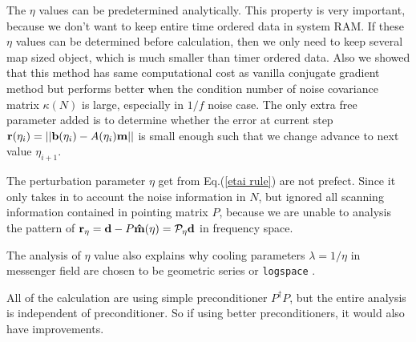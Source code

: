 \documentclass[11pt, letterpaper]{article}
\newcommand{\vbd}{\vb{d}}
\newcommand{\vbm}{\vb{m}}
\newcommand{\vbb}{\vb{b}}
\newcommand{\hatm}{\vb{\hat{m}}}
\newcommand{\Pdagger}{P^{\dagger}}
\begin{document}
The $\eta$ values can be predetermined analytically.
This property is very important, because we don't want to keep entire time
ordered data in system RAM.
If these $\eta$ values can be determined before calculation, then we only need
to keep several map sized object, which is much smaller than timer ordered 
data.
Also we showed that this method has same computational cost as vanilla
conjugate gradient method but performs better when the condition number of 
noise covariance matrix $\kappa(N)$ is large, especially in $1/f$ noise case.
The only extra free parameter added is to determine whether the error at
current step $\vb{r}(\eta_i) = \qty||\vbb(\eta_i) - A(\eta_i) \vbm||$ is small
enough such that we change advance to next value $\eta_{i+1}$.

The perturbation parameter $\eta$ get from Eq.(\ref{etai rule}) are not
prefect. Since it only takes in to account the noise information in $N$,
but ignored all scanning information contained in pointing matrix $P$, because
we are unable to analysis the pattern of
$\vb{r}_{\eta} = \vbd - P\hatm(\eta) = \mathcal{P}_{\eta} \vbd$ in frequency
space.

The analysis of $\eta$ value also explains why cooling parameters
$\lambda=1/\eta$ in messenger field are chosen to be geometric series or
\texttt{logspace} \cite{Huffenberger_2018}.

All of the calculation are using simple preconditioner $\Pdagger P$, but 
the entire analysis is independent of preconditioner.
So if using better preconditioners, it would also have improvements.





\medskip



\end{document}
